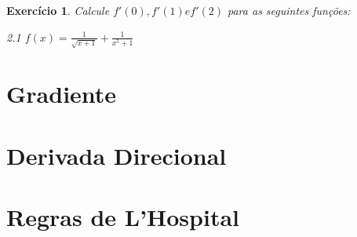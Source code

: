 \documentclass{book}
\numberwithin{defn}{chapter}
\numberwithin{exe}{chapter}
\newtheorem{ex}{Exercício}
\numberwithin{ex}{chapter}
\numberwithin{obs}{chapter}
\numberwithin{fato}{chapter}
\newtheorem{resp}{Resposta}
\numberwithin{resp}{chapter}
\begin{document}
\begin{ex}
Calcule $f'(0), f'(1) e f'(2)$ para as seguintes funções:
\item 2.1 $f(x)=\frac{1}{\sqrt{x+1}}+\frac{1}{x^5+1}$
\begin{comment}
\begin{resp}
\begin{align*}
    f(x)&=\frac{1}{\sqrt{x+1}}+\frac{1}{x^5+1}\\
    f'(x)&=(x+1)^{\frac{-1}{2}}+(x^5+1)^{-1}\\
    f'(x)&=\frac{-1}{2}(x+1)^{\frac{-3}{2}}+(-1)(x^5+1)^{-2}\cdot(5x^4)\\
    f'(x)&=\frac{-1}{2\sqrt{(x+1)^3}}-\frac{5x^4}{(x^5+1)^2}\\
    \\
    f(0)&=\frac{-1}{2}-\frac{0}{1}=\frac{-1}{2}\\
    f(1)&=\frac{-1}{2\sqrt{8}}-\frac{5}{4}=\frac{-\sqrt{8}}{16}-\frac{5}{4}=\frac{-\sqrt{8}-20}{16}=\frac{-\sqrt{2}-10}{8}\\
    f(2)&=\frac{-1}{6\sqrt{3}}-\frac{5\cdot 3^4}{244}=\frac{-1}{6\sqrt{3}}-\frac{405}{244}
\end{align*}


\item 2.2 $f(x)=3\sqrt{x^4-4x}$
\begin{align*}
    f(x)&=3\sqrt{x^4-4x}\\
    f'(x)&=\frac{6(x^3-1)}{\sqrt{x^4-4x}}\\
    \\
    f'(0)&=\not\exists\\
    f'(1)&=\not\exists\\
    f'(2)&=\frac{6(2^3-1)}{\sqrt{2^4-(4\cdot 2)}}=\frac{21}{\sqrt{2}}\\
\end{align*}
\end{resp}
\end{comment}
\end{ex}


\section{Gradiente}


\section{Derivada Direcional} 

\section{Regras de L'Hospital} 
\end{document}
